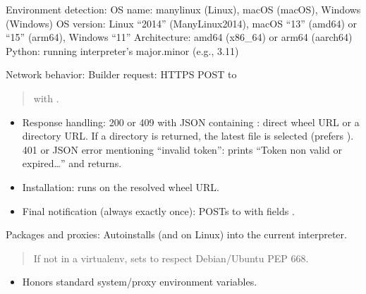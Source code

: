 \documentclass[letterpaper,10pt,english]{sphinxmanual}
\begin{document}
\begin{fulllineitems}
\begin{itemize}
\end{itemize}

\sphinxAtStartPar
Environment detection:
\sphinxhyphen{} OS name: manylinux (Linux), macOS (macOS), Windows (Windows)
\sphinxhyphen{} OS version: Linux “2014” (ManyLinux2014), macOS “13” (amd64) or “15” (arm64), Windows “11”
\sphinxhyphen{} Architecture: amd64 (x86\_64) or arm64 (aarch64)
\sphinxhyphen{} Python: running interpreter’s major.minor (e.g., 3.11)

\sphinxAtStartPar
Network behavior:
\sphinxhyphen{} Builder request: HTTPS POST to 
\begin{quote}

\sphinxAtStartPar
with .
\end{quote}
\begin{itemize}
\item {} 
\sphinxAtStartPar
Response handling:
\sphinxhyphen{} 200 or 409 with JSON containing : direct wheel URL or a directory URL.
\sphinxhyphen{} If a directory is returned, the latest file is selected (prefers ).
\sphinxhyphen{} 401 or JSON error mentioning “invalid token”: prints “Token non valid or expired…” and returns.

\item {} 
\sphinxAtStartPar
Installation: runs  on the resolved wheel URL.

\item {} 
\sphinxAtStartPar
Final notification (always exactly once): POSTs to
 with fields
.

\end{itemize}

\sphinxAtStartPar
Packages and proxies:
\sphinxhyphen{} Auto\sphinxhyphen{}installs  (and  on Linux) into the current interpreter.
\begin{quote}

\sphinxAtStartPar
If not in a virtualenv, sets  to respect Debian/Ubuntu PEP 668.
\end{quote}
\begin{itemize}
\item {} 
\sphinxAtStartPar
Honors standard system/proxy environment variables.


\end{itemize}
\end{fulllineitems}
\end{document}
